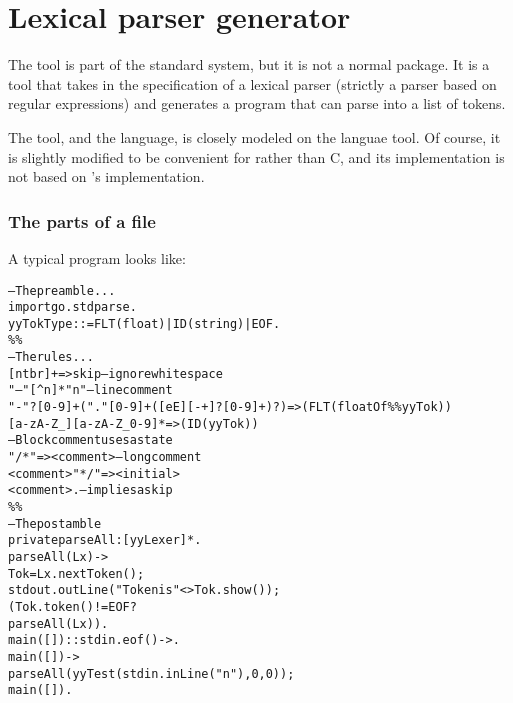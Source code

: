 \chapter{Lexical parser generator}
\label{lexer}

The \golex tool is part of the standard \go system, but it is not a normal package. It is a tool that takes in the specification of a lexical parser (strictly a parser based on regular expressions) and generates a \go program that can parse  into a list of tokens.

\begin{aside}
The \golex tool, and the \golex language, is closely modeled on the  languae tool. Of course, it is slightly modified to be convenient for \go rather than C, and its implementation is not based on 's implementation.
\end{aside}

\subsection{The parts of a \golex file}

A typical \golex program looks like:
\begin{alltt}
-- The preamble ...
import go.stdparse.
yyTokType ::= FLT(float) | ID(string) | EOF.
\%\%
-- The rules ...
 [ \bsl{}n\bsl{}t\bsl{}b\bsl{}r]+ => skip     	-- ignore white space
 "--"[^\bsl{}n]*"\bsl{}n"		       	-- line comment
 "-"?[0-9]+("."[0-9]+([eE][-+]?[0-9]+)?) => (FLT(floatOf\%\%yyTok))
 [a-zA-Z_][a-zA-Z_0-9]* => (ID(yyTok))
-- Block comment uses a state
 "/*" => <comment>        	-- long comment
  <comment> "*/" => <initial>
  <comment> .	         	-- implies a skip
\%\%
-- The postamble
  private parseAll:[yyLexer]*.
  parseAll(Lx) ->
    Tok = Lx.nextToken();
    stdout.outLine("Token is "<>Tok.show());
    ( Tok.token()!=EOF?
        parseAll(Lx)).
  main([])::stdin.eof() -> {}.
  main([]) ->
      parseAll(yyTest(stdin.inLine("\bsl{}n"),0,0));
    main([]).
\end{alltt}


